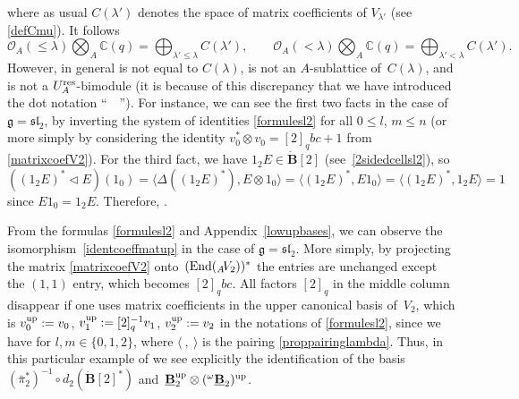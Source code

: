 \documentclass[pdftex]{sigma}
\numberwithin{equation}{section}
\theoremstyle{definition}
\newcommand{\Oo}{{\mathcal O}}
\newcommand{\smallbullet}{%
\vcenter{\hbox{\,\scalebox{0.5}{$\bullet$}\,}}
}
\begin{document}
where as usual $C(\lambda')$ denotes the space of matrix coefficients of $V_{\lambda'}$ (see \eqref{defCmu}). It follows
\begin{equation}\label{tensorCOA}
\Oo_A(\leq \lambda) \bigotimes_A {\mathbb C}(q)=\bigoplus_{\lambda'\leq \lambda}C(\lambda'), \qquad\Oo_A(<\lambda) \bigotimes_A {\mathbb C}(q)=\bigoplus_{\lambda'< \lambda}C(\lambda').
\end{equation}
However, in general \smash{${}_A \overset{\raisebox{-1.5pt}{\scriptsize$\smallbullet$}}{C} (\lambda)\bigotimes_A {\mathbb C}(q)$} is not equal to $C(\lambda)$, \smash{${}_A \overset{\raisebox{-1.5pt}{\scriptsize$\smallbullet$}}{C} (\lambda)$} is not an $A$-sublattice of~$C(\lambda)$, and \smash{${}_A \overset{\raisebox{-1.5pt}{\scriptsize$\smallbullet$}}{C} (\lambda)$} is not a $U_A^{\rm res}$-bimodule (it is because of this discrepancy that we have introduced the dot notation ``\ \smash{${}^{\smallbullet}$}\ ''). For instance, we can see the first two facts in the case of $\mathfrak{g} = {\mathfrak{sl}_2}$, by inverting the system of identities \eqref{formulesl2} for all $0\leq l$, $m\leq n$ (or more simply by considering the identity $v_0^* \otimes v_0=[2]_qbc +1$ from \eqref{matrixcoefV2}). For the third fact, we have ${1_2 E\in \dot{\mathbf{B}} [2]}$ (see~\eqref{2sidedcellsl2}), so~${((1_2 E)^* \lhd E)(1_0) \!=\!\langle \Delta((1_2 E)^* ), E\otimes 1_0\rangle\!= \! \langle(1_2 E)^* , E1_0\rangle\!=\!\langle(1_2 E)^*, 1_2E\rangle\!=\!1}$ since $E1_0\! =\! 1_2E$. Therefore, \smash{$(1_2 E)^* \lhd E \notin {}_A \overset{\raisebox{-1.5pt}{\scriptsize$\smallbullet$}}{C} (2)$}.

From the formulas \eqref{formulesl2} and Appendix~\ref{lowupbases}, we can observe the isomorphism~\eqref{identcoeffmatup} in the case of $\mathfrak{g} = {\mathfrak{sl}_2}$. More simply, by projecting the matrix \eqref{matrixcoefV2} onto~$({\rm End}({}_A \!V_2))^*$ the entries are unchanged except the $(1,1)$ entry, which becomes $[2]_q bc$. All factors $[2]_q$ in the middle column disappear if one uses matrix coefficients in the upper canonical basis of~$V_2$, which is $v_0^{\rm up}:=v_0$, $v_1^{\rm up}:=[2]_q^{-1}v_1$, $v_2^{\rm up}:=v_2$ in the notations of \eqref{formulesl2}, since we have
 for $l,m\in \{0,1,2\}$, where $\langle\ ,\ \rangle$ is the pairing \eqref{proppairinglambda}. Thus, in this particular example of  we see explicitly the identification of the basis $(\bar{\pi}_2^*)^{-1} \circ d_2(\dot{\mathbf{B}} [2]^*)$ and~${\underline{\mathbf{B}}_2^{\rm up} \otimes ({}^{\omega}\underline{\mathbf{B}}_2)^{\rm up}}$.
\end{document}
